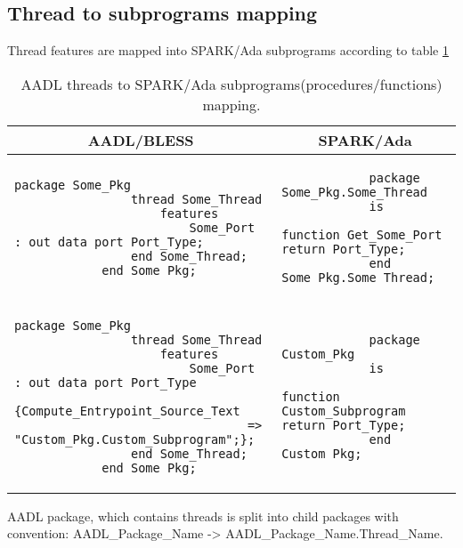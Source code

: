 \subsection{Thread to subprograms mapping}
\label{codegen:mapping:threads}

Thread features are mapped into SPARK/Ada subprograms according to table \ref{table:threads2subprograms}

\begin{table}[!ht]
	\caption{AADL threads to SPARK/Ada subprograms(procedures/functions) mapping.}
	\label{table:threads2subprograms}
	\centering
  	\begin{tabular}{ | p{3.5in} | p{2.5in} |}

		\hline
		\multicolumn{1}{|c|}{\textbf{AADL/BLESS}} & \multicolumn{1}{|c|}{\textbf{SPARK/Ada}} \\ \hline

		\begin{lstlisting}[language=aadl]
			package Some_Pkg
				thread Some_Thread
					features
						Some_Port : out data port Port_Type;
				end Some_Thread;
			end Some_Pkg;
		\end{lstlisting} 
		& 
		\begin{lstlisting}
			package Some_Pkg.Some_Thread
			is
				function Get_Some_Port return Port_Type;
			end Some_Pkg.Some_Thread;
		\end{lstlisting} 

		\\ \hline

		\begin{lstlisting}[language=aadl]
			package Some_Pkg
				thread Some_Thread
					features
						Some_Port : out data port Port_Type
							{Compute_Entrypoint_Source_Text 
								=> "Custom_Pkg.Custom_Subprogram";};
				end Some_Thread;
			end Some_Pkg;
		\end{lstlisting} 
		& 
		\begin{lstlisting}
			package Custom_Pkg
			is
				function Custom_Subprogram return Port_Type;
			end Custom_Pkg;

		\end{lstlisting} 

		\\ \hline
	\end{tabular}
\end{table}

AADL package, which contains threads is split into child packages with convention: AADL\_Package\_Name -> AADL\_Package\_Name.Thread\_Name.

